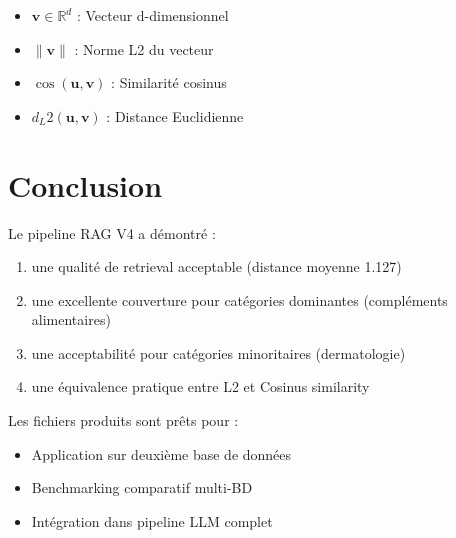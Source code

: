 \documentclass[12pt,a4paper]{article}
\begin{document}
\begin{itemize}
    \item $\mathbf{v} \in \mathbb{R}^d$ : Vecteur d-dimensionnel
    \item $\|\mathbf{v}\|$ : Norme L2 du vecteur
    \item $\cos(\mathbf{u}, \mathbf{v})$ : Similarité cosinus
    \item $d_L2(\mathbf{u}, \mathbf{v})$ : Distance Euclidienne
\end{itemize}

\section{Conclusion}

Le pipeline RAG V4 a démontré :

\begin{enumerate}
    \item une qualité de retrieval acceptable (distance moyenne 1.127)
    \item une excellente couverture pour catégories dominantes (compléments alimentaires)
    \item une acceptabilité pour catégories minoritaires (dermatologie)
    \item une équivalence pratique entre L2 et Cosinus similarity
\end{enumerate}

Les fichiers produits sont prêts pour :
\begin{itemize}
    \item Application sur deuxième base de données
    \item Benchmarking comparatif multi-BD
    \item Intégration dans pipeline LLM complet
\end{itemize}
\end{document}
